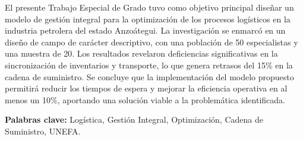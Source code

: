 
El presente Trabajo Especial de Grado tuvo como objetivo principal diseñar un modelo de gestión integral para la optimización de los procesos logísticos en la industria petrolera del estado Anzoátegui. La investigación se enmarcó en un diseño de campo de carácter descriptivo, con una población de 50 especialistas y una muestra de 20. Los resultados revelaron deficiencias significativas en la sincronización de inventarios y transporte, lo que genera retrasos del 15\% en la cadena de suministro. Se concluye que la implementación del modelo propuesto permitirá reducir los tiempos de espera y mejorar la eficiencia operativa en al menos un 10\%, aportando una solución viable a la problemática identificada.
\vspace{1em} %

\noindent\textbf{Palabras clave:} Logística, Gestión Integral, Optimización, Cadena de Suministro, UNEFA.
